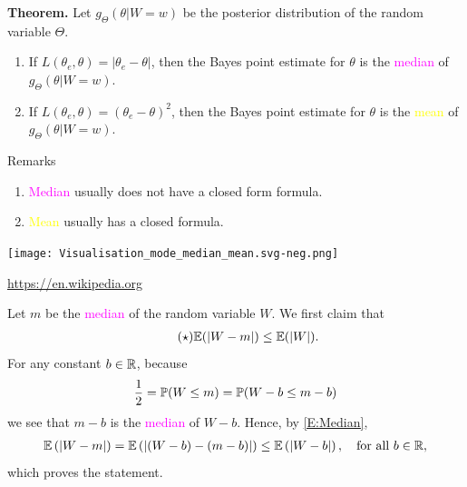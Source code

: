 \begin{frame}

 {\bf Theorem.} Let $g_\Theta(\theta|W=w)$ be the posterior distribution of the random variable $\Theta$. \\[1em]
 \begin{enumerate}
  \item If $L(\theta_e,\theta)=|\theta_e-\theta|$, then the Bayes point estimate for $\theta$ is the \textcolor{magenta}{median} of  $g_\Theta(\theta|W=w)$.\\[1em]
  \item If $L(\theta_e,\theta)=(\theta_e-\theta)^2$, then the Bayes point estimate for $\theta$ is the \textcolor{yellow}{mean} of  $g_\Theta(\theta|W=w)$.
 \end{enumerate}
 \vfill \pause
 \vfill
\pause
Remarks
\begin{enumerate}
 \item \textcolor{magenta}{Median} usually does not have a closed form formula.
 \item \textcolor{yellow}{Mean} usually has a closed formula.
\end{enumerate}
\end{frame}
\begin{frame}
\centering

\texttt{[image: Visualisation\_mode\_median\_mean.svg-neg.png]}

\vfill
\footnotesize
\url{https://en.wikipedia.org}
\end{frame}
\begin{frame}[fragile]

\begin{proofnoend}[ of Part 1. ]
Let $m$ be the \textcolor{magenta}{median} of the random variable $W$. We first claim that
\begin{align}
  \label{E:Median}\tag{$\star$}
  \mathbb{E}(|W-m|)\le \mathbb{E}(|W|).
\end{align}
For any constant $b\in\mathbb{R}$, because
\begin{align*}
  \frac{1}{2} =\mathbb{P}(W\le m) = \mathbb{P}(W-b\le m-b)
\end{align*}
we see that $m-b$ is the \textcolor{magenta}{median} of $W-b$. Hence, by \eqref{E:Median},
\begin{align*}
  \mathbb{E}\left(|W-m|\right) =\mathbb{E}\left(|(W-b)-(m-b)|\right) \le \mathbb{E}\left(|W-b|\right),\quad \text{for all $b\in\mathbb{R}$},
\end{align*}
which proves the statement.
\end{proofnoend}
\end{frame}
